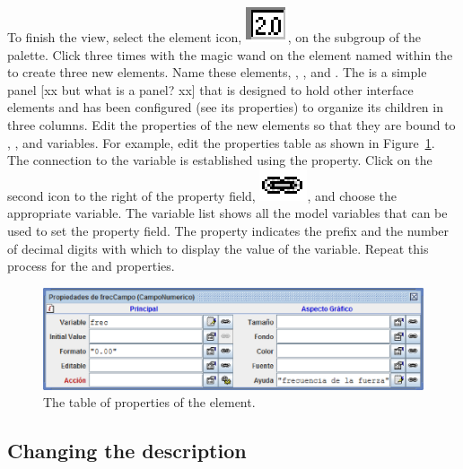 To finish the view, select the  element icon, \includegraphics[scale=\linescale]{images/Elements/ParsedField.eps}, on the  subgroup of the  palette. Click three times with the magic wand on the element named  within the  to create three new elements. Name these elements, , , and . The  is a simple panel [xx but what is a panel? xx] that is designed to hold other interface elements and has been configured (see its properties) to organize its children in three columns. Edit the properties of the new  elements so that they are bound to , , and  variables. For example, edit the  properties table as shown in Figure~\ref{fig:02EjsIntro/ModifyField}. The connection to the  variable is established using the  property.  Click on the second icon to the right of the property field, \includegraphics[scale=\linescale]{images/link.eps}, and choose the appropriate variable. The variable list shows all the model variables that can be used to set the property field. The  property indicates the prefix and the number of decimal digits with which to display the value of the variable. Repeat this process for the  and  properties.

\begin{figure}[htb]
    \centering
  \includegraphics[scale=\scale]{02EjsIntro/images/ModifyField.eps}
    \caption{The table of properties of the  element.}
    \label{fig:02EjsIntro/ModifyField}
\end{figure}

\subsection{Changing the description}\label{section:02ModifyingDescription}

